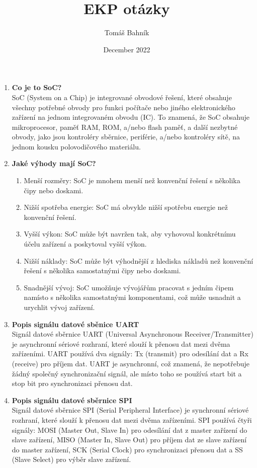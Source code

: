 \documentclass{article}
\title{EKP otázky}
\author{Tomáš Bahník}
\date{December 2022}
\begin{document}
    \maketitle

    \begin{enumerate}
        \item \textbf{Co je to SoC?} \\[0.6em] { SoC (System on a Chip) je integrované obvodové řešení, které obsahuje všechny potřebné obvody pro funkci počítače nebo jiného elektronického zařízení na jednom integrovaném obvodu (IC). To znamená, že SoC obsahuje mikroprocesor, paměť RAM, ROM, a/nebo flash paměť, a další nezbytné obvody, jako jsou kontroléry sběrnice, periférie, a/nebo kontroléry sítě, na jednom kousku polovodičového materiálu.}
        \item \textbf{Jaké výhody mají SoC?} \\ [-1.5em]
        \begin{enumerate}
        \item {Menší rozměry: SoC je mnohem menší než konvenční řešení s několika čipy nebo doskami.}
        \item {Nižší spotřeba energie: SoC má obvykle nižší spotřebu energie než konvenční řešení.}
        \item {Vyšší výkon: SoC může být navržen tak, aby vyhovoval konkrétnímu účelu zařízení a poskytoval vyšší výkon.}
        \item {Nižší náklady: SoC může být výhodnější z hlediska nákladů než konvenční řešení s několika samostatnými čipy nebo doskami.}
        \item {Snadnější vývoj: SoC umožňuje vývojářům pracovat s jedním čipem namísto s několika samostatnými komponentami, což může usnadnit a urychlit vývoj zařízení.}
        \end{enumerate}
        \item \textbf{Popis signálu datové sběnice UART} \\[0.6em] { Signál datové sběrnice UART (Universal Asynchronous Receiver/Transmitter) je asynchronní sériové rozhraní, které slouží k přenosu dat mezi dvěma zařízeními. UART používá dva signály: Tx (transmit) pro odesílání dat a Rx (receive) pro příjem dat. UART je asynchronní, což znamená, že nepotřebuje žádný společný synchronizační signál, ale místo toho se používá start bit a stop bit pro synchronizaci přenosu dat.}
        \item \textbf{Popis signálu datové sběrnice SPI} \\[0.6em] { Signál datové sběrnice SPI (Serial Peripheral Interface) je synchronní sériové rozhraní, které slouží k přenosu dat mezi dvěma zařízeními. SPI používá čtyři signály: MOSI (Master Out, Slave In) pro odesílání dat z master zařízení do slave zařízení, MISO (Master In, Slave Out) pro příjem dat ze slave zařízení do master zařízení, SCK (Serial Clock) pro synchronizaci přenosu dat a SS (Slave Select) pro výběr slave zařízení.}

\end{enumerate}
\end{document}
